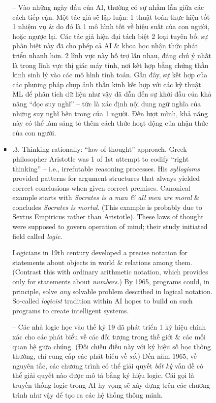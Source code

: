 \documentclass{article}
\begin{document}
\begin{itemize}
\begin{itemize}
\begin{itemize}
\begin{itemize}
				-- Vào những ngày đầu của AI, thường có sự nhầm lẫn giữa các cách tiếp cận. Một tác giả sẽ lập luận: 1 thuật toán thực hiện tốt 1 nhiệm vụ \& do đó là 1 mô hình tốt về hiệu suất của con người, hoặc ngược lại. Các tác giả hiện đại tách biệt 2 loại tuyên bố; sự phân biệt này đã cho phép cả AI \& khoa học nhận thức phát triển nhanh hơn. 2 lĩnh vực này hỗ trợ lẫn nhau, đáng chú ý nhất là trong lĩnh vực thị giác máy tính, nơi kết hợp bằng chứng thần kinh sinh lý vào các mô hình tính toán. Gần đây, sự kết hợp của các phương pháp chụp ảnh thần kinh kết hợp với các kỹ thuật ML để phân tích dữ liệu như vậy đã dẫn đến sự khởi đầu của khả năng ``đọc suy nghĩ'' -- tức là xác định nội dung ngữ nghĩa của những suy nghĩ bên trong của 1 người. Đến lượt mình, khả năng này có thể làm sáng tỏ thêm cách thức hoạt động của nhận thức của con người.
				\item {.3. Thinking rationally: ``law of thought'' approach.} Greek philosopher {\sc Aristotle} was 1 of 1st attempt to codify ``right thinking'' -- i.e., irrefutable reasoning processes. His {\it syllogisms} provided patterns for argument structures that always yielded correct conclusions when given correct premises. Canonical example starts with {\it Socrates is a man \& all men are moral} \& concludes {\it Socrates is mortal}. (This example is probably due to {\sc Sextus Empiricus} rather than {\sc Aristotle}). These laws of thought were supposed to govern operation of mind; their study initiated field called {\it logic}.
				
				Logicians in 19th century developed a precise notation for statements about objects in world \& relations among them. (Contrast this with ordinary arithmetic notation, which provides only for statements about {\it numbers}.) By 1965, programs could, in principle, solve {\it any} solvable problem described in logical notation. So-called {\it logicist} tradition within AI hopes to build on such programs to create intelligent systems.
				
				-- Các nhà logic học vào thế kỷ 19 đã phát triển 1 ký hiệu chính xác cho các phát biểu về các đối tượng trong thế giới \& các mối quan hệ giữa chúng. (Đối chiếu điều này với ký hiệu số học thông thường, chỉ cung cấp các phát biểu về {\it số}.) Đến năm 1965, về nguyên tắc, các chương trình có thể giải quyết {\it bất kỳ} vấn đề có thể giải quyết nào được mô tả bằng ký hiệu logic. Cái gọi là truyền thống logic trong AI hy vọng sẽ xây dựng trên các chương trình như vậy để tạo ra các hệ thống thông minh.
				

\end{itemize}
\end{itemize}
\end{itemize}
\end{itemize}
\end{document}
